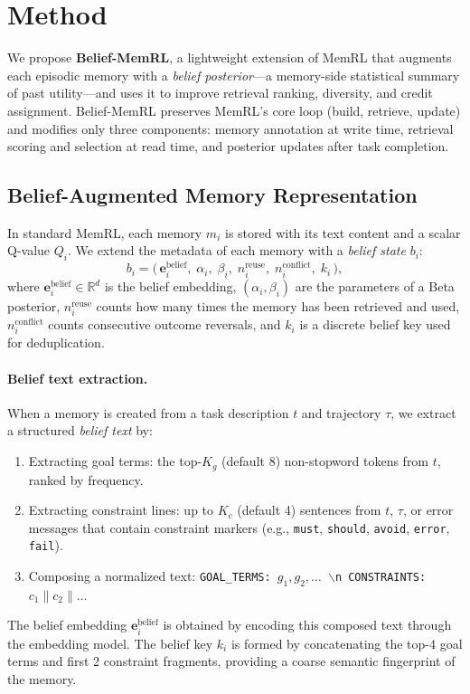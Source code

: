 \section{Method}
\label{sec:method}

We propose \textbf{Belief-MemRL}, a lightweight extension of MemRL that augments each episodic memory with a \emph{belief posterior}---a memory-side statistical summary of past utility---and uses it to improve retrieval ranking, diversity, and credit assignment. Belief-MemRL preserves MemRL's core loop (build, retrieve, update) and modifies only three components: memory annotation at write time, retrieval scoring and selection at read time, and posterior updates after task completion.

\subsection{Belief-Augmented Memory Representation}
\label{sec:belief-repr}

In standard MemRL, each memory $m_i$ is stored with its text content and a scalar Q-value $Q_i$. We extend the metadata of each memory with a \emph{belief state} $b_i$:
\begin{equation}
  b_i = \bigl(\, \mathbf{e}_i^{\mathrm{belief}},\; \alpha_i,\; \beta_i,\; n_i^{\mathrm{reuse}},\; n_i^{\mathrm{conflict}},\; k_i \,\bigr),
\end{equation}
where $\mathbf{e}_i^{\mathrm{belief}} \in \mathbb{R}^d$ is the belief embedding, $(\alpha_i, \beta_i)$ are the parameters of a Beta posterior, $n_i^{\mathrm{reuse}}$ counts how many times the memory has been retrieved and used, $n_i^{\mathrm{conflict}}$ counts consecutive outcome reversals, and $k_i$ is a discrete belief key used for deduplication.

\paragraph{Belief text extraction.}
When a memory is created from a task description $t$ and trajectory $\tau$, we extract a structured \emph{belief text} by:
\begin{enumerate}
  \item Extracting goal terms: the top-$K_g$ (default 8) non-stopword tokens from $t$, ranked by frequency.
  \item Extracting constraint lines: up to $K_c$ (default 4) sentences from $t$, $\tau$, or error messages that contain constraint markers (e.g., \texttt{must}, \texttt{should}, \texttt{avoid}, \texttt{error}, \texttt{fail}).
  \item Composing a normalized text: \texttt{GOAL\_TERMS: $g_1, g_2, \ldots$ $\backslash$n CONSTRAINTS: $c_1 \| c_2 \| \ldots$}
\end{enumerate}
The belief embedding $\mathbf{e}_i^{\mathrm{belief}}$ is obtained by encoding this composed text through the embedding model. The belief key $k_i$ is formed by concatenating the top-4 goal terms and first 2 constraint fragments, providing a coarse semantic fingerprint of the memory.

